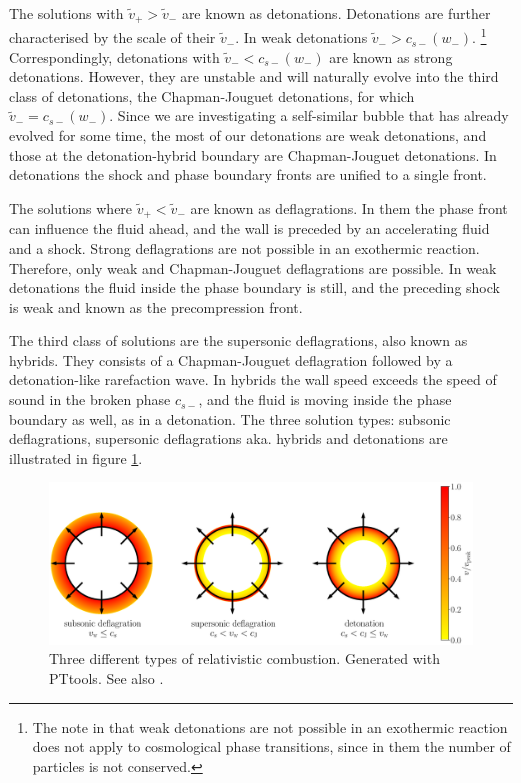 The solutions with $\tilde{v}_+ > \tilde{v}_-$ are known as detonations.
Detonations are further characterised by the scale of their $\tilde{v}_-$.
In weak detonations $\tilde{v}_- > c_{s-}(w_-)$.%
\footnote{The note in \cite[p. 265]{rezzolla_relativistic_2013} that weak detonations are not possible in an exothermic reaction does not apply to cosmological phase transitions, since in them the number of particles is not conserved.}
Correspondingly, detonations with $\tilde{v}_- < c_{s-}(w_-)$ are known as strong detonations.
However, they are unstable and will naturally evolve into the third class of detonations,
the Chapman-Jouguet detonations, for which $\tilde{v}_- = c_{s-}(w_-)$.
\cite[p. 279]{rezzolla_relativistic_2013}
Since we are investigating a self-similar bubble that has already evolved for some time,
the most of our detonations are weak detonations,
and those at the detonation-hybrid boundary are Chapman-Jouguet detonations.
In detonations the shock and phase boundary fronts are unified to a single front.
\cite{kurki-suonio_supersonic_1995}

The solutions where $\tilde{v}_+ < \tilde{v}_-$ are known as deflagrations.
In them the phase front can influence the fluid ahead, and the wall is preceded by an accelerating fluid and a shock.
Strong deflagrations are not possible in an exothermic reaction.
\cite[p. 267]{rezzolla_relativistic_2013}
Therefore, only weak and Chapman-Jouguet deflagrations are possible.
In weak detonations the fluid inside the phase boundary is still, and the preceding shock is weak and
known as the precompression front.
\cite{rezzolla_relativistic_2013}

The third class of solutions are the supersonic deflagrations, also known as hybrids.
They consists of a Chapman-Jouguet deflagration followed by a detonation-like rarefaction wave.
In hybrids the wall speed exceeds the speed of sound in the broken phase $c_{s-}$,
and the fluid is moving inside the phase boundary as well, as in a detonation.
\cites{kurki-suonio_supersonic_1995}[p. 37]{lecture_notes}[p. 35]{hindmarsh_gw_pt_2019}
The three solution types: subsonic deflagrations, supersonic deflagrations aka. hybrids and detonations are illustrated in figure \ref{fig:solution_types}.

\begin{figure}[ht!]
\centering
\includegraphics[width=\textwidth]{msc2-python/fig/relativistic_combustion.eps}
\caption{Three different types of relativistic combustion. Generated with PTtools. See also \cites[fig. 14]{lecture_notes}[fig. 14]{mazumdar_review_2019}.}
\label{fig:solution_types}
\end{figure}


